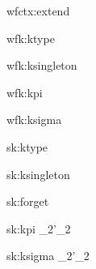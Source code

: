 \documentclass{article}
\theoremstyle{break}
\begin{document}
\infrule
  {}
  {\validcontext{\emptycontext}}

  {wfctx:extend}
  {\validkind{\context}{\kind}\qquad
     \cvar\not\in\BV{\context}}
  {\validcontext{\emptycontext,\sbindconstructor{\cvar}{\kind}}}



  {wfk:ktype}
  {\validcontext{\context}}
  {\validkind{\context}{\ktype}}

  {wfk:ksingleton}
  {\validconstructor{\context}{\constructor}{\ktype}}
  {\validkind{\context}{\ksingleton{\constructor}}}

  {wfk:kpi}
  {\qquad
   }
  {}

  {wfk:ksigma}
  {\qquad
   }
  {\validkind{\context}
     {}}


  {sk:ktype}
  {\validcontext{\context}}
  {\subkind{\context}{\ktype}{\ktype}}

  {sk:ksingleton}
  {}
  {
     {}}


  {sk:forget}
  {\validkind{\context}{\ksingleton{\constructor}}}
  {\subkind{\context}{\ksingleton{\constructor}}{\ktype}}

  {sk:kpi}
  {\qquad
                {\kind_2}{\kind'_2}}
  {\subkind{\context}
      {}
      {}}

  {sk:ksigma}
  {\quad
        {\kind_2}{\kind'_2}}
  {\subkind{\context}
     {}
     {}}

   {\validconstructor{\context}{\constructor}{\kind}}
\end{document}
